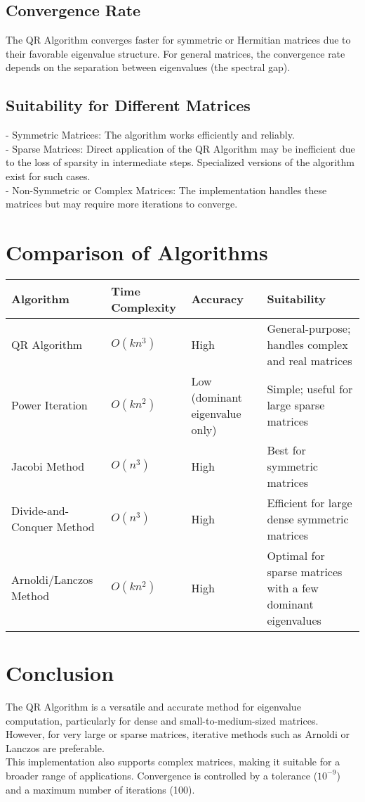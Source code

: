 \documentclass[12pt]{article}
\begin{document}
\subsection*{Convergence Rate}
The QR Algorithm converges faster for symmetric or Hermitian matrices due to their favorable eigenvalue structure. For general matrices, the convergence rate depends on the separation between eigenvalues (the spectral gap).

\subsection*{Suitability for Different Matrices}
- Symmetric Matrices: The algorithm works efficiently and reliably.\\
- Sparse Matrices: Direct application of the QR Algorithm may be inefficient due to the loss of sparsity in intermediate steps. Specialized versions of the algorithm exist for such cases.\\
- Non-Symmetric or Complex Matrices: The implementation handles these matrices but may require more iterations to converge.

\section*{Comparison of Algorithms}
\begin{tabular}{|l|l|l|l|}
\hline
\textbf{Algorithm}        & \textbf{Time Complexity} & \textbf{Accuracy} & \textbf{Suitability}                     \\ \hline
QR Algorithm              & \( O(kn^3) \)           & High             & General-purpose; handles complex and real matrices \\ \hline
Power Iteration           & \( O(kn^2) \)           & Low (dominant eigenvalue only) & Simple; useful for large sparse matrices   \\ \hline
Jacobi Method             & \( O(n^3) \)            & High             & Best for symmetric matrices                \\ \hline
Divide-and-Conquer Method & \( O(n^3) \)            & High             & Efficient for large dense symmetric matrices \\ \hline
Arnoldi/Lanczos Method    & \( O(kn^2) \)           & High             & Optimal for sparse matrices with a few dominant eigenvalues \\ \hline
\end{tabular}

\section*{Conclusion}
The QR Algorithm is a versatile and accurate method for eigenvalue computation, particularly for dense and small-to-medium-sized matrices. However, for very large or sparse matrices, iterative methods such as Arnoldi or Lanczos are preferable.\\
This implementation also supports complex matrices, making it suitable for a broader range of applications. Convergence is controlled by a tolerance (\( 10^{-9} \)) and a maximum number of iterations (100).
\end{document}
